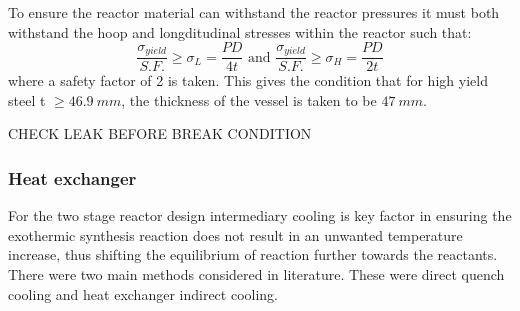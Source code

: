 \documentclass[11pt, a4paper]{article}
\begin{document}
{\begin{table}[!htbp]
\begin{center}
	\end{center}
\end{table}

To ensure the reactor material can withstand the reactor pressures it must both withstand the hoop and longditudinal stresses within the reactor such that:
\begin{equation}
\frac{\sigma_{yield}}{S.F.} \geq \sigma_L=\frac{PD}{4t} \text{  and  } \frac{\sigma_{yield}}{S.F.} \geq \sigma_H=\frac{PD}{2t}
\end{equation}
where a safety factor of 2 is taken. This gives the condition that for high yield steel t $\geq 46.9\ mm$, the thickness of the vessel is taken to be $47\ mm$.

CHECK LEAK BEFORE BREAK CONDITION

\subsubsection{Heat exchanger}

For the two stage reactor design intermediary cooling is key factor in ensuring the exothermic synthesis reaction does not result in an unwanted temperature increase, thus shifting the equilibrium of reaction further towards the reactants. There were two main methods considered in literature. These were direct quench cooling and heat exchanger indirect cooling.

}
\end{document}
